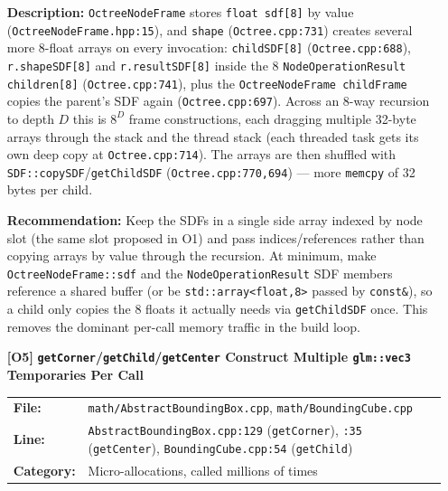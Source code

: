 \documentclass[a4paper,12pt]{article}
\newcommand{\severitybox}[2]{%
  \colorbox{#1}{\makebox[2.5cm][c]{\textcolor{white}{\textbf{#2}}}}%
}
\begin{document}
\begin{enumerate}[leftmargin=*]
  \textbf{Description:}
  \texttt{OctreeNodeFrame} stores \texttt{float sdf[8]} by value
  (\texttt{OctreeNodeFrame.hpp:15}), and \texttt{shape} (\texttt{Octree.cpp:731})
  creates several more 8-float arrays on every invocation: \texttt{childSDF[8]}
  (\texttt{Octree.cpp:688}), \texttt{r.shapeSDF[8]} and \texttt{r.resultSDF[8]}
  inside the 8 \texttt{NodeOperationResult children[8]} (\texttt{Octree.cpp:741}),
  plus the \texttt{OctreeNodeFrame childFrame} copies the parent's SDF again
  (\texttt{Octree.cpp:697}). Across an 8-way recursion to depth $D$ this is
  $8^{D}$ frame constructions, each dragging multiple 32-byte arrays through the
  stack and the thread stack (each threaded task gets its own deep copy at
  \texttt{Octree.cpp:714}). The arrays are then shuffled with
  \texttt{SDF::copySDF}/\texttt{getChildSDF} (\texttt{Octree.cpp:770,694}) — more
  \texttt{memcpy} of 32 bytes per child.

  \textbf{Recommendation:}
  Keep the SDFs in a single side array indexed by node slot (the same slot proposed
  in O1) and pass indices/references rather than copying arrays by value through
  the recursion. At minimum, make \texttt{OctreeNodeFrame::sdf} and the
  \texttt{NodeOperationResult} SDF members reference a shared buffer (or be
  \texttt{std::array<float,8>} passed by \texttt{const\&}), so a child only copies
  the 8 floats it actually needs via \texttt{getChildSDF} once. This removes the
  dominant per-call memory traffic in the build loop.

\item[\textbf{[O5]}] \textbf{\texttt{getCorner}/\texttt{getChild}/\texttt{getCenter} Construct Multiple \texttt{glm::vec3} Temporaries Per Call}
  \hfill \severitybox{mediumcolor}{MEDIUM}

  \begin{tabular}{ll}
    \textbf{File:} & \texttt{math/AbstractBoundingBox.cpp}, \texttt{math/BoundingCube.cpp} \\
    \textbf{Line:} & \texttt{AbstractBoundingBox.cpp:129} (\texttt{getCorner}),
                      \texttt{:35} (\texttt{getCenter}),
                      \texttt{BoundingCube.cpp:54} (\texttt{getChild}) \\
    \textbf{Category:} & Micro-allocations, called millions of times \\
  \end{tabular}


\end{enumerate}
\end{document}
